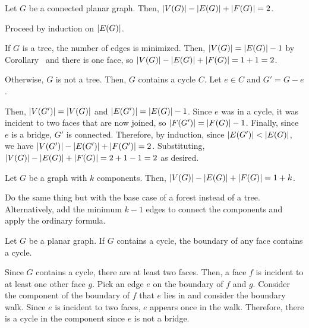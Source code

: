 \documentclass[class=math239,notes,tikz]{agony}
\begin{document}
\begin{theorem}\label{thm:euler}
  Let $G$ be a connected planar graph.
  Then, $\abs{V(G)} - \abs{E(G)} + \abs{F(G)} = 2$.
\end{theorem}
\begin{prf}
  Proceed by induction on $\abs{E(G)}$.

  If $G$ is a tree, the number of edges is minimized.
  Then, $\abs{V(G)} = \abs{E(G)} - 1$ by Corollary~
  and there is one face, so $\abs{V(G)} - \abs{E(G)} + \abs{F(G)} = 1 + 1 = 2$.

  Otherwise, $G$ is not a tree.
  Then, $G$ contains a cycle $C$.
  Let $e \in C$ and $G' = G - e$.

  Then, $\abs{V(G')} = \abs{V(G)}$ and $\abs{E(G')} = \abs{E(G)} - 1$.
  Since $e$ was in a cycle, it was incident to two faces that are now joined,
  so $\abs{F(G')} = \abs{F(G)} - 1$.
  Finally, since $e$ is a bridge, $G'$ is connected.
  Therefore, by induction, since $\abs{E(G')} < \abs{E(G)}$,
  we have $\abs{V(G')} - \abs{E(G')} + \abs{F(G')} = 2$.
  Substituting, $\abs{V(G)} - \abs{E(G)} + \abs{F(G)} = 2 + 1 - 1 = 2$ as desired.
\end{prf}

\begin{corollary}\label{cor:euler}
  Let $G$ be a graph with $k$ components.
  Then, $\abs{V(G)} - \abs{E(G)} + \abs{F(G)} = 1 + k$.
\end{corollary}
\begin{prf}
  Do the same thing but with the base case of a forest instead of a tree.
  Alternatively, add the minimum $k-1$ edges to connect the components
  and apply the ordinary formula.
\end{prf}

\begin{lemma}[7.5.1]\label{lem:751}
  Let $G$ be a planar graph. If $G$ contains a cycle,
  the boundary of any face contains a cycle.
\end{lemma}
\begin{prf}
  Since $G$ contains a cycle, there are at least two faces.
  Then, a face $f$ is incident to at least one other face $g$.
  Pick an edge $e$ on the boundary of $f$ and $g$.
  Consider the component of the boundary of $f$ that $e$ lies in
  and consider the boundary walk.
  Since $e$ is incident to two faces, $e$ appears once in the walk.
  Therefore, there is a cycle in the component since $e$ is not a bridge.
\end{prf}
\end{document}
